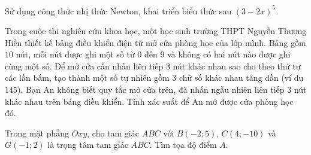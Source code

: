 \begin{bt}%
Sử dụng công thức nhị thức Newton, khai triển biểu thức sau $(3-2x)^5$.	
\end{bt}
\begin{bt}%
	Trong cuộc thi nghiên cứu khoa học, một học sinh trường THPT Nguyễn Thượng Hiền thiết kế bảng điều khiển điện tử mở cửa phòng học của lớp mình. Bảng gồm $10$ nút, mỗi nút được ghi một số từ $0$ đến $9$ và không có hai nút nào được ghi cùng một số. Để mở cửa cần nhấn liên tiếp $3$ nút khác nhau sao cho theo thứ tự các lần bấm, tạo thành một số tự nhiên gồm $3$ chữ số khác nhau tăng dần (ví dụ $145$). Bạn An không biết quy tắc mở cửa trên, đã nhấn ngẫu nhiên liên tiếp $3$ nút khác nhau trên bảng điều khiển. Tính xác suất để An mở được cửa phòng học đó.
\end{bt}

\begin{bt}%
	Trong mặt phẳng $Oxy$, cho tam giác $ABC$ với $B(-2;5)$, $C(4;-10)$ và $G(-1;2)$ là trọng tâm tam giác $ABC$. Tìm tọa độ điểm $A$.
\end{bt}

